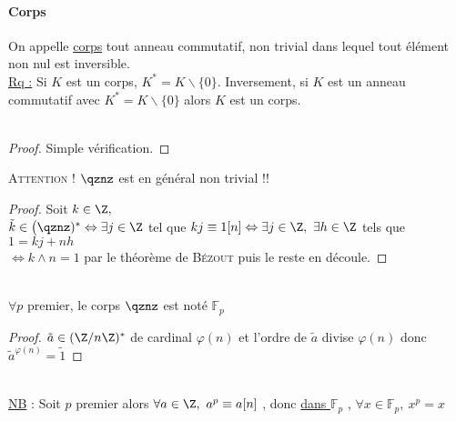 		\paragraph{Corps}
			On appelle \uline{corps} tout anneau commutatif, non trivial dans lequel tout élément non nul est inversible. \trait
		\vspace*{-1.1cm} \\ \uline{Rq :} Si $K$ est un corps, $K^* = K\backslash\{0\}$. Inversement, si $K$ est un anneau commutatif avec $K^*=K\backslash\{0\}$ alors $K$ est un corps.
		\vspace*{0.5cm} \\ 
		\vspace*{0.5cm} \\ 
		\begin{proof}
		Simple vérification.
		\end{proof}
		\textsc{Attention !} $\qznz$ est en général non trivial !!
		\vspace*{0.5cm} \\ 
		\begin{proof}
		Soit $k\in\Z ,$ \\ $ \tilde{k}\in \big(\qznz)^* \Leftrightarrow \exists j\in\Z$ tel que $kj\equiv 1[n] \Leftrightarrow \exists j\in\Z ,~\exists h\in\Z$ tels que $1=kj +nh$\\
		$\Leftrightarrow k\wedge n = 1$ par le théorème de \textsc{Bézout} puis le reste en découle.
		\end{proof}
		${}$ \\ 
		\\ $\forall p$ premier, le corps $\qznz$ est noté $\mathds{F}_p$
		\vspace*{0.5cm} \\ 
		\begin{proof}
		$\tilde{a} \in (\Z/n\Z)^*$ de cardinal $\varphi(n)$ et l'ordre de $\tilde{a}$ divise $\varphi(n)$ donc $\tilde{a}^{\varphi(n)}=\tilde{1}$
		\end{proof}
		${}$ \\  \\
		\uline{NB} : Soit $p$ premier alors $\forall a\in\Z ,~ a^p\equiv a[n]$ , 
		donc \uline{dans $\mathbb{F}_p$} , $\forall x\in\mathbb{F}_p ,~x^p=x$ 
